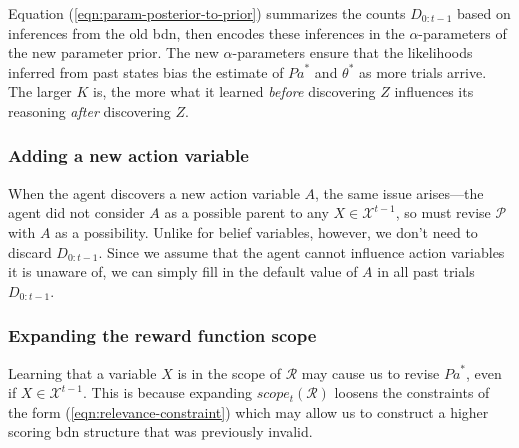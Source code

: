 \documentclass{article}
\newcommand{\bdn}{{\sc bdn}}
\newcommand{\Pa}{\mathit{Pa}}
\begin{document}
	Equation (\ref{eqn:param-posterior-to-prior}) summarizes the counts $D_{0:t-1}$ based on inferences from the old \bdn{}, then encodes these inferences in the $\alpha$-parameters of the new parameter prior. The new $\alpha$-parameters ensure that the likelihoods inferred from past states bias the estimate of $\Pa^*$ and $\theta^*$ as more trials arrive. The larger $K$ is, the more what it learned \emph{before} discovering $Z$ influences its reasoning \emph{after} discovering $Z$.
	
	\subsubsection{Adding a new action variable}
	
	When the agent discovers a new action variable $A$, the same issue arises---the agent did not consider $A$ as a possible parent to any $X \in \mathcal{X}^{t-1}$, so must revise $\mathcal{P}$ with $A$ as a possibility. Unlike for belief variables, however, we don't need to discard $D_{0:t-1}$. Since we assume that the agent cannot influence action variables it is unaware of, we can simply fill in the default value of $A$ in all past trials $D_{0:t-1}$.
	
	\subsubsection{Expanding the reward function scope}
	Learning that a variable $X$ is in the scope of $\mathcal{R}$ may cause us to revise $\Pa^*$, even if $X \in \mathcal{X}^{t-1}$. This is because expanding $scope_t(\mathcal{R})$ loosens the constraints of the form (\ref{eqn:relevance-constraint}) which may allow us to construct a higher scoring \bdn{} structure that was previously invalid.
	
\end{document}
